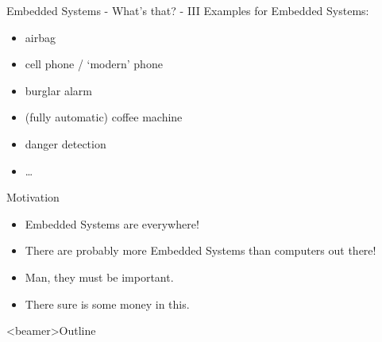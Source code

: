 \documentclass[ngerman={babel}, utf8, bigger, xcolor={table,dvipsnames}, ompress, hyperref={bookmarks,colorlinks}]{beamer}
\begin{document}
\begin{frame}{Embedded Systems - What's that? - III}
	Examples for Embedded Systems:
	\begin{itemize}
		\item airbag
		\item cell phone / `modern' phone
		\item burglar alarm
		\item (fully automatic) coffee machine
		\item danger detection %
		\item \dots
	\end{itemize}
\end{frame}

\begin{frame}{Motivation}
	\onslide<+->{We see:}
	\begin{itemize}%
		\item Embedded Systems are everywhere!
		\item There are probably more Embedded Systems than computers out there!
	\end{itemize}
	\begin{itemize}%
		\item Man, they must be important.
		\item There sure is some money in this. %
	\end{itemize}
\end{frame}

\begin{frame}<beamer>{Outline}
\tableofcontents
\end{frame}
\end{document}
